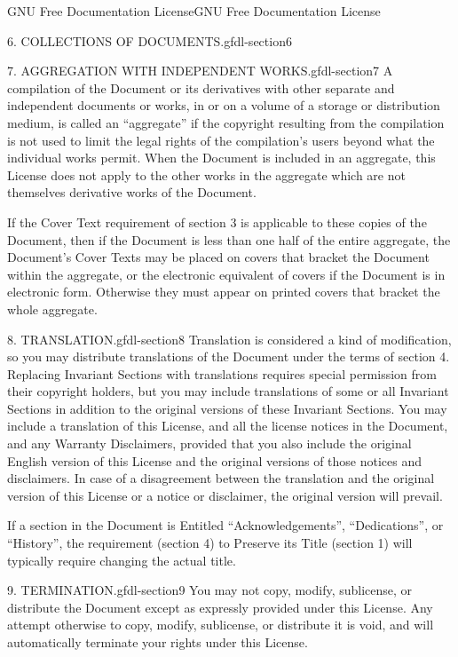 \documentclass[10pt,]{book}
\numberwithin{equation}{section}
\begin{document}
\begin{appendixptx}{GNU Free Documentation License}{}{GNU Free Documentation License}{}{}
\begin{paragraphs}{6. COLLECTIONS OF DOCUMENTS.}{gfdl-section6}
\end{paragraphs}%
\begin{paragraphs}{7. AGGREGATION WITH INDEPENDENT WORKS.}{gfdl-section7}%
\hypertarget{p-566}{}%
A compilation of the Document or its derivatives with other separate and independent documents or works, in or on a volume of a storage or distribution medium, is called an ``aggregate'' if the copyright resulting from the compilation is not used to limit the legal rights of the compilation's users beyond what the individual works permit. When the Document is included in an aggregate, this License does not apply to the other works in the aggregate which are not themselves derivative works of the Document.%
\par
\hypertarget{p-567}{}%
If the Cover Text requirement of section 3 is applicable to these copies of the Document, then if the Document is less than one half of the entire aggregate, the Document's Cover Texts may be placed on covers that bracket the Document within the aggregate, or the electronic equivalent of covers if the Document is in electronic form. Otherwise they must appear on printed covers that bracket the whole aggregate.%
\end{paragraphs}%
\begin{paragraphs}{8. TRANSLATION.}{gfdl-section8}%
\hypertarget{p-568}{}%
Translation is considered a kind of modification, so you may distribute translations of the Document under the terms of section 4. Replacing Invariant Sections with translations requires special permission from their copyright holders, but you may include translations of some or all Invariant Sections in addition to the original versions of these Invariant Sections. You may include a translation of this License, and all the license notices in the Document, and any Warranty Disclaimers, provided that you also include the original English version of this License and the original versions of those notices and disclaimers. In case of a disagreement between the translation and the original version of this License or a notice or disclaimer, the original version will prevail.%
\par
\hypertarget{p-569}{}%
If a section in the Document is Entitled ``Acknowledgements'', ``Dedications'', or ``History'', the requirement (section 4) to Preserve its Title (section 1) will typically require changing the actual title.%
\end{paragraphs}%
\begin{paragraphs}{9. TERMINATION.}{gfdl-section9}%
\hypertarget{p-570}{}%
You may not copy, modify, sublicense, or distribute the Document except as expressly provided under this License. Any attempt otherwise to copy, modify, sublicense, or distribute it is void, and will automatically terminate your rights under this License.%

\end{paragraphs}
\end{appendixptx}
\end{document}
